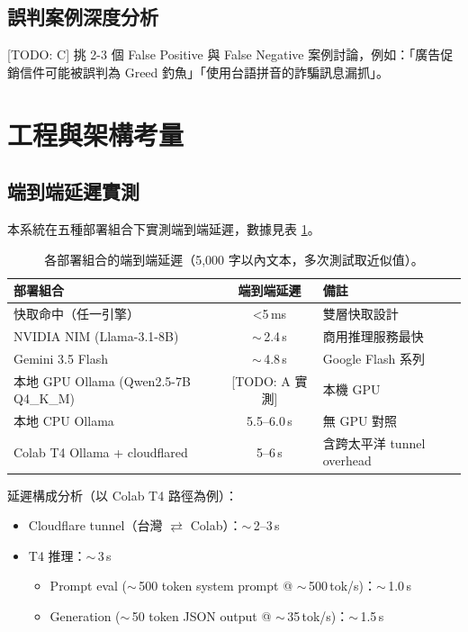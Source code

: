 \documentclass[11pt, a4paper]{article}
\begin{document}
\subsection{誤判案例深度分析}
[TODO: C] 挑 2-3 個 False Positive 與 False Negative 案例討論，例如：「廣告促銷信件可能被誤判為 Greed 釣魚」「使用台語拼音的詐騙訊息漏抓」。

\section{工程與架構考量}\label{sec:engineering}

\subsection{端到端延遲實測}
本系統在五種部署組合下實測端到端延遲，數據見表 \ref{tab:latency}。

\begin{table}[h]
  \centering
  \small
  \begin{tabular}{lcl}
    \toprule
    \textbf{部署組合} & \textbf{端到端延遲} & \textbf{備註} \\
    \midrule
    快取命中（任一引擎）              & \textless 5\,ms       & 雙層快取設計 \\
    NVIDIA NIM (Llama-3.1-8B)         & $\sim$\,2.4\,s        & 商用推理服務最快 \\
    Gemini 3.5 Flash                  & $\sim$\,4.8\,s        & Google Flash 系列 \\
    本地 GPU Ollama (Qwen2.5-7B Q4\_K\_M) & [TODO: A 實測] & 本機 GPU \\
    本地 CPU Ollama                    & 5.5--6.0\,s           & 無 GPU 對照 \\
    Colab T4 Ollama + cloudflared      & 5--6\,s              & 含跨太平洋 tunnel overhead \\
    \bottomrule
  \end{tabular}
  \caption{各部署組合的端到端延遲（5,000 字以內文本，多次測試取近似值）。}
  \label{tab:latency}
\end{table}

延遲構成分析（以 Colab T4 路徑為例）：

\begin{itemize}[leftmargin=2em]
  \item Cloudflare tunnel（台灣 $\rightleftarrows$ Colab）：$\sim$\,2--3\,s
  \item T4 推理：$\sim$\,3\,s
  \begin{itemize}
    \item Prompt eval ($\sim$\,500 token system prompt @ $\sim$\,500\,tok/s)：$\sim$\,1.0\,s
    \item Generation ($\sim$\,50 token JSON output @ $\sim$\,35\,tok/s)：$\sim$\,1.5\,s
  \end{itemize}
\end{itemize}
\end{document}
